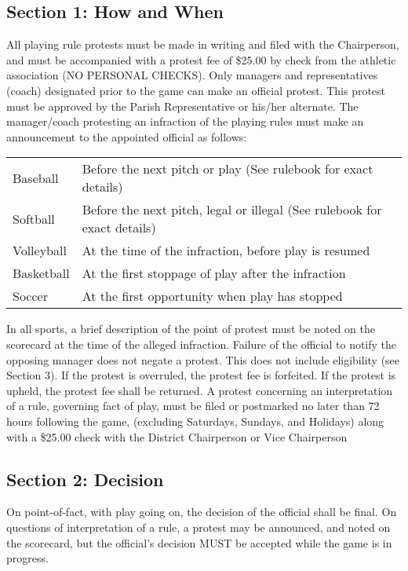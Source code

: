 \documentclass[letteraper,10pt,oneside,draft]{memoir}
\begin{document}
\subsection{Section 1: How and When}
All playing rule protests must be made in writing and filed with the Chairperson, and must be accompanied with a protest fee of \$25.00 by check from the athletic association (NO PERSONAL CHECKS).  Only managers and representatives (coach) designated prior to the game can make an official protest.  This protest must be approved by the Parish Representative or his/her alternate.  The manager/coach protesting an infraction of the playing rules must make an announcement to the appointed official as follows:
\begin{center}
    \begin{tabular}{l l}
        Baseball & Before the next pitch or play (See rulebook for exact details) \\
        Softball & Before the next pitch, legal or illegal (See rulebook for exact details) \\
        Volleyball & At the time of the infraction, before play is resumed \\
        Basketball & At the first stoppage of play after the infraction \\
        Soccer & At the first opportunity when play has stopped \\
    \end{tabular}
\end{center}

In all sports, a brief description of the point of protest must be noted on the scorecard at the time of the alleged infraction.  Failure of the official to notify the opposing manager does not negate a protest.   This does not include eligibility (see Section 3).  If the protest is overruled, the protest fee is forfeited. If the protest is upheld, the protest fee shall be returned. A protest concerning an interpretation of a rule, governing fact of play, must be filed or postmarked no later than 72 hours following the game, (excluding Saturdays, Sundays, and Holidays) along with a \$25.00 check with the District Chairperson or Vice Chairperson 

\subsection{Section 2: Decision}
On point-of-fact, with play going on, the decision of the official shall be final.  On questions of interpretation of a rule, a protest may be announced, and noted on the scorecard, but the official's decision MUST be accepted while the game is in progress.
\end{document}
